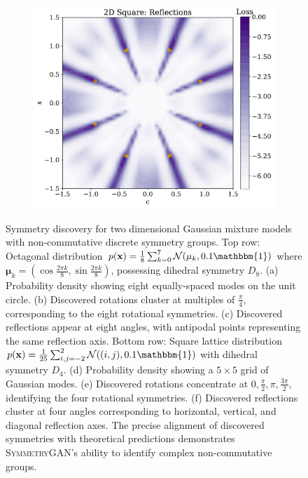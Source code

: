 \begin{figure}
\begin{subfigure}[b]{0.28\textwidth}
        \caption{}
        \label{fig:otherdistributions_2D_v}
    \end{subfigure}
    \hfill
    \begin{subfigure}[b]{0.27\textwidth}
        \centering
        \includegraphics[height=\textwidth]{figures/chapter-09/2dsquarereflections.pdf}
        \caption{}
        \label{fig:otherdistributions_2D_vi}
    \end{subfigure}
    
    \caption[Discovery of dihedral symmetries $D_8$ and $D_4$ in octagonal and square lattice Gaussian mixtures.]{Symmetry discovery for two dimensional Gaussian mixture models with non-commutative discrete symmetry groups. Top row: Octagonal distribution $p(\mathbf{x}) = \frac{1}{8}\sum_{k=0}^{7} \mathcal{N}(\mathbf{\mu}_k, 0.1\mathbbm{1})$ where $\mathbf{\mu}_k = (\cos\frac{2\pi k}{8}, \sin\frac{2\pi k}{8})$, possessing dihedral symmetry $D_8$. (a) Probability density showing eight equally-spaced modes on the unit circle. (b) Discovered rotations cluster at multiples of $\frac{\pi}{4}$, corresponding to the eight rotational symmetries. (c) Discovered reflections appear at eight angles, with antipodal points representing the same reflection axis. Bottom row: Square lattice distribution $p(\mathbf{x}) = \frac{1}{25}\sum_{i,j=-2}^{2} \mathcal{N}((i,j), 0.1\mathbbm{1})$ with dihedral symmetry $D_4$. (d) Probability density showing a $5 \times 5$ grid of Gaussian modes. (e) Discovered rotations concentrate at $0, \frac{\pi}{2}, \pi, \frac{3\pi}{2}$, identifying the four rotational symmetries. (f) Discovered reflections cluster at four angles corresponding to horizontal, vertical, and diagonal reflection axes. The precise alignment of discovered symmetries with theoretical predictions demonstrates \textsc{SymmetryGAN}'s ability to identify complex non-commutative groups.}
    \label{fig:otherdistributions-2D}
\end{figure}
